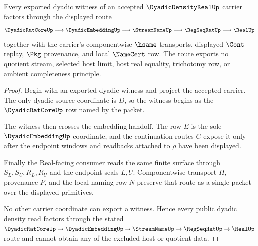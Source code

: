 \begin{theorem}
\label{thm:dyadic-density-real-witness-route}
Every exported dyadic witness of an accepted $\DyadicDensityRealUp$ carrier
factors through the displayed route
$$
\DyadicRatCoreUp \longrightarrow \DyadicEmbeddingUp \longrightarrow
\StreamNameUp \longrightarrow \RegSeqRatUp \longrightarrow \RealUp
$$
together with the carrier's componentwise $\hsame$ transports, displayed
$\Cont$ replay, $\Pkg$ provenance, and local $\NameCert$ row. The route exports
no quotient stream, selected host limit, host real equality, trichotomy row, or
ambient completeness principle.
\end{theorem}
\begin{proof}
Begin with an exported dyadic witness and project the accepted carrier. The
only dyadic source coordinate is $D$, so the witness begins as the
$\DyadicRatCoreUp$ row named by the packet.

The witness then crosses the embedding handoff. The row $E$ is the sole
$\DyadicEmbeddingUp$ coordinate, and the continuation routes $C$ expose it
only after the endpoint windows and readbacks attached to $\rho$ have been
displayed.

Finally the Real-facing consumer reads the same finite surface through
$S_L,S_U,R_L,R_U$ and the endpoint seals $L,U$. Componentwise transport $H$,
provenance $P$, and the local naming row $N$ preserve that route as a single
packet over the displayed primitives.

No other carrier coordinate can export a witness. Hence every public dyadic
density read factors through the stated
$\DyadicRatCoreUp \to \DyadicEmbeddingUp \to \StreamNameUp \to
\RegSeqRatUp \to \RealUp$ route and cannot obtain any of the excluded host or
quotient data.
\end{proof}

\begin{closurestatus}{\DyadicDensityRealUp}
  \theoryclosure{\seedClosure}
  \formalstatus{\unformalizedV}
\end{closurestatus}
